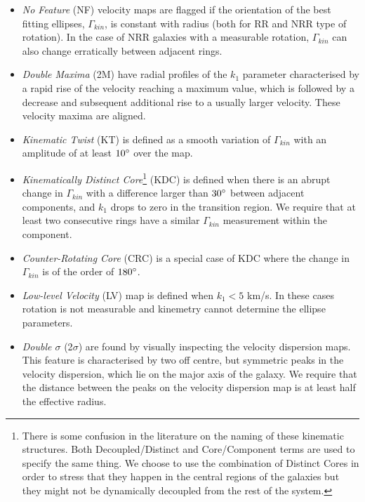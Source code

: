 \documentclass[usenatbib,usegraphicx]{mn2e}
\begin{document}
\begin{itemize}

\item {\it No Feature} (NF) velocity maps are flagged if the orientation of the best fitting ellipses, $\Gamma_{kin}$, is constant with radius (both for RR and NRR type of rotation).  In the case of NRR galaxies with a measurable rotation, $\Gamma_{kin}$ can also change erratically between adjacent rings.

\item {\it Double Maxima} (2M) have radial profiles of the $k_1$ parameter characterised by a rapid rise of the velocity reaching a maximum value, which is followed by a decrease and subsequent additional rise to a usually larger velocity. These velocity maxima are aligned.

\item {\it Kinematic Twist} (KT) is defined as a smooth variation of $\Gamma_{kin}$ with an amplitude of at least $10\hbox{$^\circ$}$ over the map.

\item {\it Kinematically Distinct Core}\footnote{There is some confusion in the literature on the naming of these kinematic structures. Both Decoupled/Distinct and Core/Component terms are used to specify the same thing. We choose to use the combination of Distinct Cores in order to stress that they happen in the central regions of the galaxies but they might not be dynamically decoupled from the rest of the system.} (KDC) is defined when there is an abrupt change in $\Gamma_{kin}$ with a difference larger than $30\hbox{$^\circ$}$ between adjacent components, and $k_1$ drops to zero in the transition region. We require that at least two consecutive rings have a similar $\Gamma_{kin}$ measurement within the component. 

\item {\it Counter-Rotating Core} (CRC) is a special case of KDC where the change in $\Gamma_{kin}$ is of the order of $180\hbox{$^\circ$}$. 

\item {\it Low-level Velocity} (LV) map is defined when $k_1 < 5$ km/s. In these cases rotation is not measurable and kinemetry cannot determine the ellipse parameters. 

\item {\it Double $\sigma$} (2$\sigma$) are found by visually inspecting the velocity dispersion maps. This feature is characterised by two off centre, but symmetric peaks in the velocity dispersion, which lie on the major axis of the galaxy. We require that the distance between the peaks on the velocity dispersion map is at least half the effective radius. 

\end{itemize}
\end{document}

